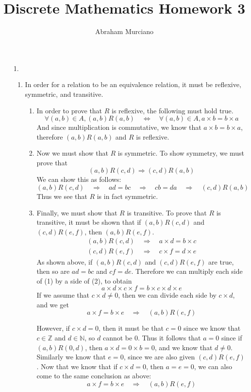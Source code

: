 \documentclass[fleqn]{article}
\title{Discrete Mathematics Homework 3}
\author{Abraham Murciano}
\begin{document}
\maketitle

\begin{enumerate}

	\item[1.]
	\begin{enumerate}
		\item %
		In order for a relation to be an equivalence relation, it must be reflexive, symmetric, and transitive. 
		\begin{enumerate}
			\item %
			In order to prove that \(R\) is reflexive, the following must hold true.
			\[\forall (a, b) \in A, (a, b)R(a, b) \quad \Leftrightarrow \quad \forall (a, b) \in A, a \times b = b \times a\]
			And since multiplication is commutative, we know that \(a \times b = b \times a\), therefore \((a, b)R(a, b)\) and \(R\) is reflexive.

			\item %
			Now we must show that \(R\) is symmetric. To show symmetry, we must prove that 
			\[(a, b)R(c, d) \Rightarrow (c, d)R(a, b)\]
			We can show this as follows:
			\[
				(a, b)R(c, d) \quad \Rightarrow \quad ad = bc \quad \Rightarrow \quad cb = da \quad \Rightarrow \quad (c, d)R(a, b)
			\]
			Thus we see that \(R\) is in fact symmetric.

			\item %
			Finally, we must show that \(R\) is transitive. To prove that \(R\) is transitive, it must be shown that if \((a, b)R(c, d)\) and \((c, d)R(e, f)\), then \((a, b)R(e, f)\).
			\begin{gather}
				(a, b)R(c, d) \quad \Rightarrow \quad a \times d = b \times c \\
				(c, d)R(e, f) \quad \Rightarrow \quad c \times f = d \times e
			\end{gather}
			As shown above, if \((a, b)R(c, d)\) and \((c, d)R(e, f)\) are true, then so are \(ad = bc\) and \(cf = de\). Therefore we can multiply each side of (1) by a side of (2), to obtain
			\[a \times d \times c \times f = b \times c \times d \times e\]
			If we assume that \(c \times d \neq 0\), then we can divide each side by \(c \times d\), and we get
			\[a \times f = b \times e \quad \Rightarrow \quad (a, b)R(e, f)\]

			However, if \(c \times d = 0\), then it must be that \(c = 0\) since we know that \(c \in \mathbb{Z}\) and \(d \in \mathbb{N}\), so \(d\) cannot be 0. Thus it follows that \(a = 0\) since if \((a, b)R(0, d)\), then \(a \times d = 0 \times b = 0\), and we know that \(d \neq 0\). Similarly we know that \(e = 0\), since we are also given \((c, d)R(e, f)\). Now that we know that if \(c \times d = 0\), then \(a = e = 0\), we can also come to the same conclusion as above:
			\[a \times f = b \times e \quad \Rightarrow \quad (a, b)R(e, f)\]
		\end{enumerate}


\end{enumerate}
\end{enumerate}
\end{document}

